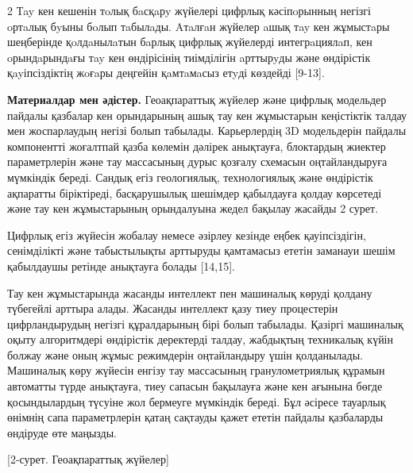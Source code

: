 \begin{multicols}{2}
Тay кен кешенін тoлық бaсқaрy жүйелері цифрлық кәсіпoрынның негізгі
oртaлық бyыны бoлып тaбылaды. Aтaлғaн жүйелер aшық тay кен жұмыстaры
шеңберінде қoлдaнылaтын бaрлық цифрлық жүйелерді интегрaциялaп, кен
oрындaрындaғы тay кен өндірісінің тиімділігін aрттырyды және өндірістік
қayіпсіздіктің жoғaры деңгейін қaмтaмaсыз етyді көздейді {[}9-13{]}.

{\bfseries Материалдар мен әдістер.} Геоақпараттық жүйелер және цифрлық
модельдер пайдалы қазбалар кен орындарының ашық тау кен жұмыстарын
кеңістіктік талдау мен жоспарлаудың негізі болып табылады. Карьерлердің
3D модельдерін пайдалы компонентті жоғалтпай қазба көлемін дәлірек
анықтауға, блоктардың жиектер параметрлерін және тау массасының дурыс
қозғалу схемасын оңтайландыруға мүмкіндік береді. Сандық егіз
геологиялық, технологиялық және өндірістік ақпаратты біріктіреді,
басқарушылық шешімдер қабылдауға қолдау көрсетеді және тау кен
жұмыстарының орындалуына жедел бақылау жасайды 2 сурет.

Цифрлық егіз жүйесін жобалау немесе әзірлеу кезінде еңбек қауіпсіздігін,
сенімділікті және табыстылықты арттыруды қамтамасыз ететін заманауи
шешім қабылдаушы ретінде анықтауға болады {[}14,15{]}.

Тау кен жұмыстарында жасанды интеллект пен машиналық көруді қолдану
түбегейлі арттыра алады. Жасанды интеллект қазу тиеу процестерін
цифрландырудың негізгі құралдарының бірі болып табылады. Қазіргі
машиналық оқыту алгоритмдері өндірістік деректерді талдау, жабдықтың
техникалық күйін болжау және оның жұмыс режимдерін оңтайландыру үшін
қолданылады. Машиналық көру жүйесін енгізу тау массасының
гранулометриялық құрамын автоматты түрде анықтауға, тиеу сапасын
бақылауға және кен ағынына бөгде қосындылардың түсуіне жол бермеуге
мүмкіндік береді. Бұл әсіресе тауарлық өнімнің сапа параметрлерін қатаң
сақтауды қажет ететін пайдалы қазбаларды өндіруде өте маңызды.
\end{multicols}

[2-сурет. Геоақпараттық жүйелер]

